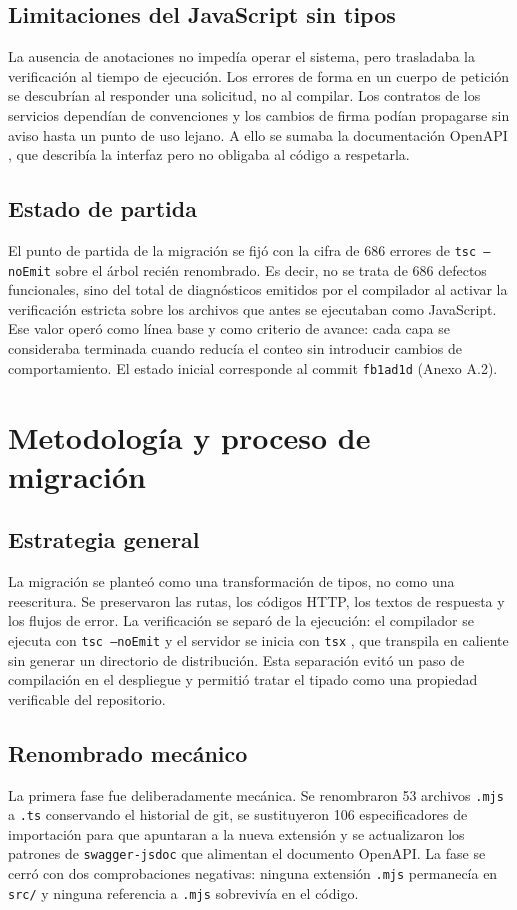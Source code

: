\documentclass[conference]{IEEEtran}
\begin{document}
\subsection{Limitaciones del JavaScript sin tipos}
La ausencia de anotaciones no impedía operar el sistema, pero trasladaba la
verificación al tiempo de ejecución. Los errores de forma en un cuerpo de
petición se descubrían al responder una solicitud, no al compilar. Los
contratos de los servicios dependían de convenciones y los cambios de firma
podían propagarse sin aviso hasta un punto de uso lejano. A ello se sumaba la
documentación OpenAPI \cite{openapi}, que describía la interfaz pero no
obligaba al código a respetarla.

\subsection{Estado de partida}
El punto de partida de la migración se fijó con la cifra de 686 errores de
\texttt{tsc --noEmit} sobre el árbol recién renombrado. Es decir, no se trata
de 686 defectos funcionales, sino del total de diagnósticos emitidos por el
compilador al activar la verificación estricta sobre los archivos que antes se
ejecutaban como JavaScript. Ese valor operó como línea base y como criterio de
avance: cada capa se consideraba terminada cuando reducía el conteo sin
introducir cambios de comportamiento. El estado inicial corresponde al commit
\texttt{fb1ad1d} (Anexo A.2).

\section{Metodología y proceso de migración}

\subsection{Estrategia general}
La migración se planteó como una transformación de tipos, no como una
reescritura. Se preservaron las rutas, los códigos HTTP, los textos de
respuesta y los flujos de error. La verificación se separó de la ejecución: el
compilador se ejecuta con \texttt{tsc --noEmit} y el servidor se inicia con
\texttt{tsx} \cite{tsx}, que transpila en caliente sin generar un directorio
de distribución. Esta separación evitó un paso de compilación en el despliegue y
permitió tratar el tipado como una propiedad verificable del repositorio.

\subsection{Renombrado mecánico}
La primera fase fue deliberadamente mecánica. Se renombraron 53 archivos
\texttt{.mjs} a \texttt{.ts} conservando el historial de git, se sustituyeron
106 especificadores de importación para que apuntaran a la nueva extensión y
se actualizaron los patrones de \texttt{swagger-jsdoc} que alimentan el
documento OpenAPI. La fase se cerró con dos comprobaciones negativas: ninguna
extensión \texttt{.mjs} permanecía en \texttt{src/} y ninguna referencia a
\texttt{.mjs} sobrevivía en el código.
\end{document}
